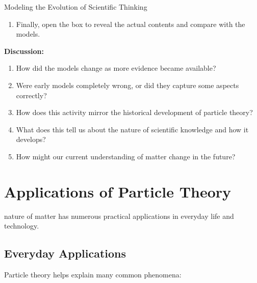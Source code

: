 \begin{investigation}{Modeling the Evolution of Scientific Thinking}
\begin{enumerate}
    \item Finally, open the box to reveal the actual contents and compare with the models.
\end{enumerate}

\textbf{Discussion:}
\begin{enumerate}
    \item How did the models change as more evidence became available?
    \item Were early models completely wrong, or did they capture some aspects correctly?
    \item How does this activity mirror the historical development of particle theory?
    \item What does this tell us about the nature of scientific knowledge and how it develops?
    \item How might our current understanding of matter change in the future?
\end{enumerate}
\end{investigation}


\section{Applications of Particle Theory}

 nature of matter has numerous practical applications in everyday life and technology.

\subsection{Everyday Applications}

Particle theory helps explain many common phenomena:

